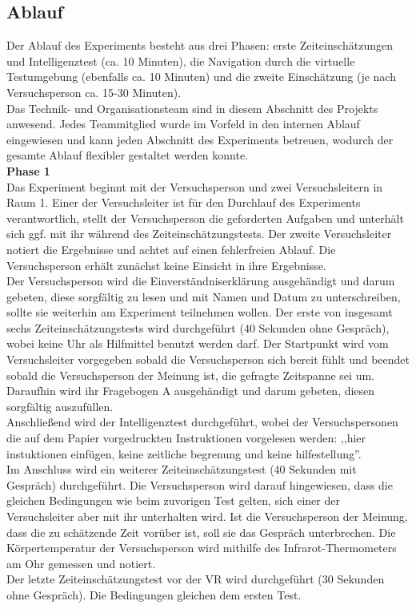 \documentclass{Bericht}
\begin{document}
\subsection{Ablauf}

Der Ablauf des Experiments besteht aus drei Phasen: erste Zeiteinschätzungen und Intelligenztest (ca. 10 Minuten), die Navigation durch die virtuelle Testumgebung (ebenfalls ca. 10 Minuten) und die zweite Einschätzung (je nach Versuchsperson ca. 15-30 Minuten).\\
Das Technik- und Organisationsteam sind in diesem Abschnitt des Projekts anwesend. Jedes Teammitglied wurde im Vorfeld in den internen Ablauf eingewiesen und kann jeden Abschnitt des Experiments betreuen, wodurch der gesamte Ablauf flexibler gestaltet werden konnte.\\ 

\textbf{Phase 1}\\
Das Experiment beginnt mit der Versuchsperson und zwei Versuchsleitern in Raum 1. Einer der Versuchsleiter ist für den Durchlauf des Experiments verantwortlich, stellt der Versuchsperson die geforderten Aufgaben und unterhält sich ggf. mit ihr während des Zeiteinschätzungstests. Der zweite Versuchsleiter notiert die Ergebnisse und achtet auf einen fehlerfreien Ablauf. Die Versuchsperson erhält zunächst keine Einsicht in ihre Ergebnisse.\\
Der Versuchsperson wird die Einverständniserklärung ausgehändigt und darum gebeten, diese sorgfältig zu lesen und mit Namen und Datum zu unterschreiben, sollte sie weiterhin am Experiment teilnehmen wollen.
Der erste von insgesamt sechs Zeiteinschätzungstests wird durchgeführt (40 Sekunden ohne Gespräch), wobei keine Uhr als Hilfmittel benutzt werden darf.
Der Startpunkt wird vom Versuchsleiter vorgegeben sobald die Versuchsperson sich bereit fühlt und beendet sobald die Versuchsperson der Meinung ist, die gefragte Zeitspanne sei um.
Daraufhin wird ihr Fragebogen A ausgehändigt und darum gebeten, diesen sorgfältig auszufüllen.\\
Anschließend wird der Intelligenztest durchgeführt, wobei der Versuchspersonen die auf dem Papier vorgedruckten Instruktionen vorgelesen werden: 
,,hier instuktionen einfügen, keine zeitliche begrenung und keine hilfestellung''.\\
Im Anschluss wird ein weiterer Zeiteinschätzungstest  (40 Sekunden mit Gespräch) durchgeführt. Die Versuchsperson wird darauf hingewiesen, dass die gleichen Bedingungen wie beim zuvorigen Test gelten, sich einer der Versuchsleiter aber mit ihr unterhalten wird. Ist die Versuchsperson der Meinung, dass die zu schätzende Zeit vorüber ist, soll sie das Gespräch unterbrechen. Die Körpertemperatur der Versuchsperson wird mithilfe des Infrarot-Thermometers am Ohr gemessen und notiert.\\
Der letzte Zeiteinschätzungstest vor der VR wird durchgeführt (30 Sekunden ohne Gespräch). Die Bedingungen gleichen dem ersten Test.
\end{document}
